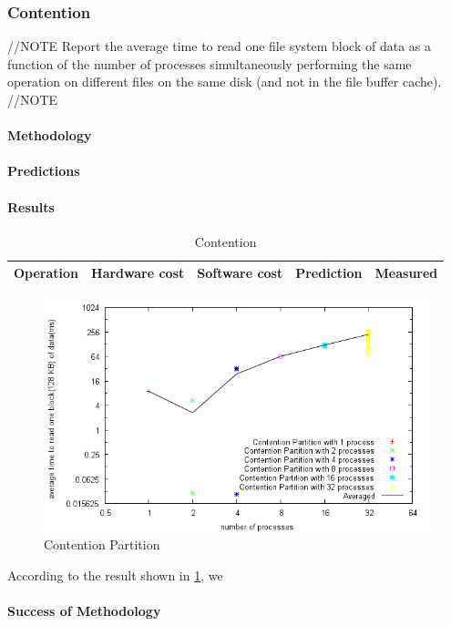 \subsubsection{Contention}
//NOTE
Report the average time to read one file system block of data as a function of the number of processes simultaneously performing the same operation on different files on the same disk (and not in the file buffer cache).
//NOTE

\paragraph{Methodology}

\paragraph{Predictions}
\paragraph{Results}
\begin{table}
\begin{center}
\begin{tabular}{| l | l | l | l | l |}
\hline
Operation & Hardware cost & Software cost & Prediction & Measured \\
\hline
\end{tabular}
\end{center}
\caption{Contention\label{tab:contention}}
\end{table}



\begin{figure}[h]
\begin{center}
\includegraphics[scale=0.8]{contentionPartitionImage}
\end{center}
\caption {Contention Partition\label{fig:contention-partition}}

\end{figure}




According to the result shown in \ref{tab:contention}, we

\paragraph{Success of Methodology}


